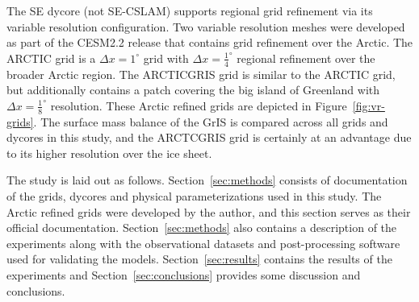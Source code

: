 \documentclass[draft]{agujournal2019}
\begin{document}
The SE dycore (not SE-CSLAM) supports regional grid refinement via its variable resolution configuration. Two variable resolution meshes were developed as part of the CESM2.2 release that contains grid refinement over the Arctic. The ARCTIC grid is a $\Delta x=1^{\circ}$ grid with $\Delta x=\frac{1}{4}^{\circ}$ regional refinement over the broader Arctic region. The ARCTICGRIS grid is similar to the ARCTIC grid, but additionally contains a patch covering the big island of Greenland with $\Delta x=\frac{1}{8}^{\circ}$ resolution. These Arctic refined grids are depicted in Figure~\ref{fig:vr-grids}. The surface mass balance of the GrIS is compared across all grids and dycores in this study, and the ARCTCGRIS grid is certainly at an advantage due to its higher resolution over the ice sheet.

The study is laid out as follows. Section~\ref{sec:methods} consists of documentation of the grids, dycores and physical parameterizations used in this study. The Arctic refined grids were developed by the author, and this section serves as their official documentation. Section~\ref{sec:methods} also contains a description of the experiments along with the observational datasets and post-processing software used for validating the models. Section~\ref{sec:results} contains the results of the experiments and Section~\ref{sec:conclusions} provides some discussion and conclusions. 
\end{document}
